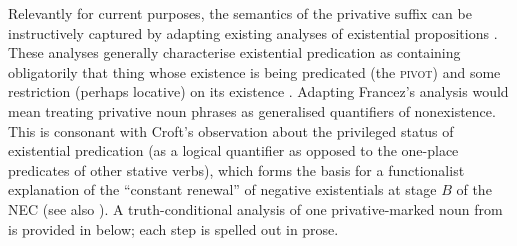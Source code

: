 \documentclass[output=paper,draft,draftmode,colorlinks,citecolor=brown]{langscibook}
\begin{document}
Relevantly for current purposes, the semantics of the privative suffix can
be instructively captured by adapting existing analyses of existential
propositions \citep[e.g.][]{Francez2007,Francez2011}. These analyses
generally characterise existential predication as containing obligatorily
that thing whose existence is being predicated (the \textsc{pivot}) and
some restriction (perhaps locative) on its existence \citep[the
\textsc{coda}; see][]{Francez2007}. Adapting Francez's analysis would mean
treating privative noun phrases as generalised quantifiers of nonexistence.
This is consonant with Croft's \citeyearpar[18]{Croft1991} observation
about the privileged status of existential predication (as a logical
quantifier as opposed to the one-place predicates of other stative verbs),
which forms the basis for a functionalist explanation of the ``constant
renewal'' of negative existentials at stage $B$ of the NEC (see also \citealt[173]{Veselinova2016}).
A truth-conditional analysis of one privative-marked noun from  is provided in  below; each step is spelled out in prose.
%
\end{document}
